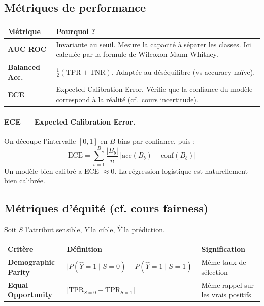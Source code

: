 \documentclass[11pt, a4paper]{article}
\begin{document}
\subsection{M\'{e}triques de performance}

\begin{table}[H]
\centering
\begin{tabular}{lp{9cm}}
\toprule
\textbf{M\'{e}trique} & \textbf{Pourquoi ?} \\
\midrule
\textbf{AUC ROC} & Invariante au seuil. Mesure la capacit\'{e} \`{a} s\'{e}parer les classes. Ici calcul\'{e}e par la formule de Wilcoxon-Mann-Whitney. \\
\textbf{Balanced Acc.} & $\frac{1}{2}(\text{TPR}+\text{TNR})$. Adapt\'{e}e au d\'{e}s\'{e}quilibre (vs accuracy na\"{i}ve). \\
\textbf{ECE} & Expected Calibration Error. V\'{e}rifie que la confiance du mod\`{e}le correspond \`{a} la r\'{e}alit\'{e} (cf.~cours incertitude). \\
\bottomrule
\end{tabular}
\end{table}

\paragraph{ECE --- Expected Calibration Error.}
On d\'{e}coupe l'intervalle $[0,1]$ en $B$ bins par confiance, puis :
$$\text{ECE} = \sum_{b=1}^{B} \frac{|B_b|}{n}\, \big|\text{acc}(B_b) - \text{conf}(B_b)\big|$$
Un mod\`{e}le bien calibr\'{e} a ECE $\approx 0$. La r\'{e}gression logistique est naturellement bien calibr\'{e}e.

\subsection{M\'{e}triques d'\'{e}quit\'{e} (cf. cours fairness)}

Soit $S$ l'attribut sensible, $Y$ la cible, $\hat{Y}$ la pr\'{e}diction.

\begin{table}[H]
\centering
\begin{tabular}{lll}
\toprule
\textbf{Crit\`{e}re} & \textbf{D\'{e}finition} & \textbf{Signification} \\
\midrule
\textbf{Demographic Parity} & $\big|P(\hat{Y}{=}1 \mid S{=}0) - P(\hat{Y}{=}1 \mid S{=}1)\big|$ & M\^{e}me taux de s\'{e}lection \\
\textbf{Equal Opportunity} & $\big|\text{TPR}_{S=0} - \text{TPR}_{S=1}\big|$ & M\^{e}me rappel sur les vrais positifs \\
\bottomrule
\end{tabular}
\end{table}
\end{document}
